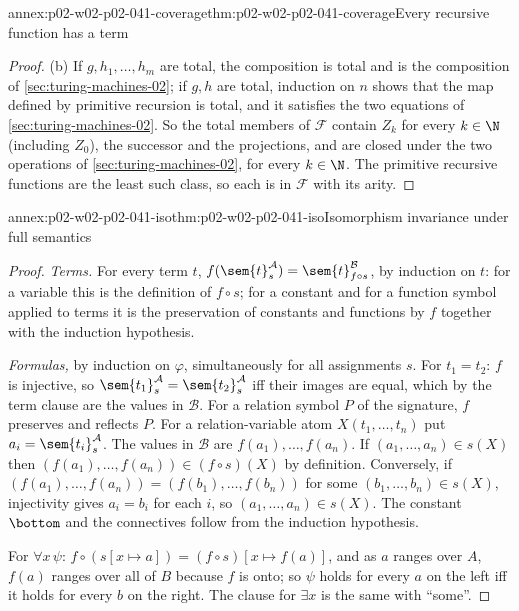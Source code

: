 \begin{annexitem}{annex:p02-w02-p02-041-coverage}{thm:p02-w02-p02-041-coverage}{Every recursive function has a term}
\begin{proof}
(b) If \(g,h_1,\ldots,h_m\) are total, the composition is total and is the
composition of \cref{sec:turing-machines-02}; if \(g,h\) are total, induction
on \(n\) shows that the map defined by primitive recursion is total, and it
satisfies the two equations of \cref{sec:turing-machines-02}.  So the total
members of \(\mathcal F\) contain \(Z_k\) for every \(k\in\N\) (including
\(Z_0\)), the successor and the projections, and are closed under the two
operations of \cref{sec:turing-machines-02}, for every \(k\in\N\).  The
primitive recursive functions are the least such class, so each is in
\(\mathcal F\) with its arity.
\end{proof}
\end{annexitem}

\begin{annexitem}{annex:p02-w02-p02-041-iso}{thm:p02-w02-p02-041-iso}{Isomorphism invariance under full semantics}
\begin{proof}
\emph{Terms.}  For every term \(t\),
\(f(\sem{t}^{\mathcal A}_s)=\sem{t}^{\mathcal B}_{f\circ s}\), by induction on
\(t\): for a variable this is the definition of \(f\circ s\); for a constant
and for a function symbol applied to terms it is the preservation of constants
and functions by \(f\) together with the induction hypothesis.

\emph{Formulas,} by induction on \(\varphi\), simultaneously for all
assignments \(s\).  For \(t_1=t_2\): \(f\) is injective, so
\(\sem{t_1}^{\mathcal A}_s=\sem{t_2}^{\mathcal A}_s\) iff their images are
equal, which by the term clause are the values in \(\mathcal B\).  For a
relation symbol \(P\) of the signature, \(f\) preserves and reflects \(P\).
For a relation-variable atom \(X(t_1,\ldots,t_n)\) put
\(a_i=\sem{t_i}^{\mathcal A}_s\).  The values in \(\mathcal B\) are
\(f(a_1),\ldots,f(a_n)\).  If \((a_1,\ldots,a_n)\in s(X)\) then
\((f(a_1),\ldots,f(a_n))\in(f\circ s)(X)\) by definition.  Conversely, if
\((f(a_1),\ldots,f(a_n))=(f(b_1),\ldots,f(b_n))\) for some
\((b_1,\ldots,b_n)\in s(X)\), injectivity gives \(a_i=b_i\) for each \(i\), so
\((a_1,\ldots,a_n)\in s(X)\).  The constant \(\bottom\) and the connectives
follow from the induction hypothesis.

For \(\forall x\,\psi\): \(f\circ(s[x\mapsto a])=(f\circ s)[x\mapsto f(a)]\), and
as \(a\) ranges over \(A\), \(f(a)\) ranges over all of \(B\) because \(f\) is
onto; so \(\psi\) holds for every \(a\) on the left iff it holds for every
\(b\) on the right.  The clause for \(\exists x\) is the same with ``some''.


\end{proof}
\end{annexitem}
